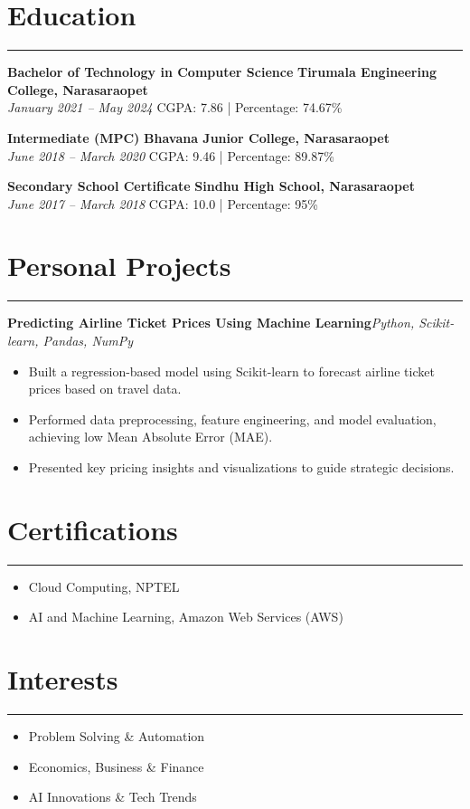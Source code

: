 \documentclass[12pt]{article}
\newenvironment{project}[1]
  {\par\textbf{#1}\hfill\textit{Python, Scikit-learn, Pandas, NumPy}\vspace{1pt}\begin{itemize}}
  {\end{itemize}\vspace{2pt}}
\begin{document}
\section*{Education}
\vspace{1pt}\hrule\vspace{4pt}
\textbf{Bachelor of Technology in Computer Science} \hfill \textbf{Tirumala Engineering College, Narasaraopet} \\
\textit{January 2021 -- May 2024} \quad CGPA: 7.86 | Percentage: 74.67\%

\textbf{Intermediate (MPC)} \hfill \textbf{Bhavana Junior College, Narasaraopet} \\
\textit{June 2018 -- March 2020} \quad CGPA: 9.46 | Percentage: 89.87\%

\textbf{Secondary School Certificate} \hfill \textbf{Sindhu High School, Narasaraopet} \\
\textit{June 2017 -- March 2018} \quad CGPA: 10.0 | Percentage: 95\%

\vspace{6pt}

\section*{Personal Projects}
\vspace{1pt}\hrule\vspace{4pt}
\begin{project}{Predicting Airline Ticket Prices Using Machine Learning}
  \item Built a regression-based model using Scikit-learn to forecast airline ticket prices based on travel data.
  \item Performed data preprocessing, feature engineering, and model evaluation, achieving low Mean Absolute Error (MAE).
  \item Presented key pricing insights and visualizations to guide strategic decisions.
\end{project}

\section*{Certifications}
\vspace{1pt}\hrule\vspace{4pt}
\begin{itemize}
  \item Cloud Computing, NPTEL
  \item AI and Machine Learning, Amazon Web Services (AWS)
\end{itemize}

\section*{Interests}
\vspace{1pt}\hrule\vspace{4pt}
\begin{itemize}
  \item Problem Solving \& Automation
  \item Economics, Business \& Finance
  \item AI Innovations \& Tech Trends
\end{itemize}
\end{document}
